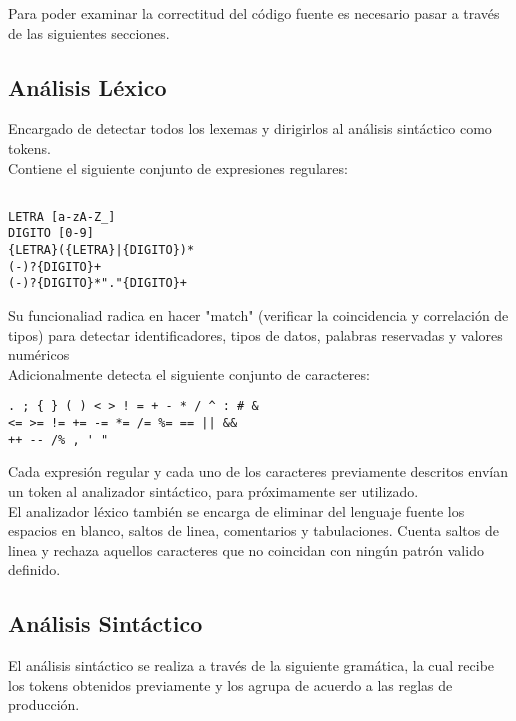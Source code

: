 \documentclass[aspectratio=169]{article}
\begin{document}
	Para poder examinar la correctitud del c\'odigo fuente es necesario pasar a trav\'es de las siguientes secciones.

\subsection{An\'alisis L\'exico}

	Encargado de detectar todos los lexemas y dirigirlos al análisis sintáctico como tokens.\\

	Contiene el siguiente conjunto de expresiones regulares:\\

\begin{lstlisting}

LETRA [a-zA-Z_]
DIGITO [0-9]
{LETRA}({LETRA}|{DIGITO})*
(-)?{DIGITO}+
(-)?{DIGITO}*"."{DIGITO}+

\end{lstlisting}

	Su funcionaliad radica en hacer "match" (verificar la coincidencia y correlaci\'on de tipos) para detectar identificadores, tipos de datos, palabras reservadas y valores numéricos\\

	Adicionalmente detecta el siguiente conjunto de caracteres: \\

\begin{lstlisting}
. ; { } ( ) < > ! = + - * / ^ : # &
<= >= != += -= *= /= %= == || &&
++ -- /% , ' "
\end{lstlisting}

	Cada expresión regular y cada uno de los caracteres previamente descritos envían un token al analizador sintáctico, para pr\'oximamente ser utilizado.\\

	El analizador léxico también se encarga de eliminar del lenguaje fuente los espacios en blanco, saltos de linea, comentarios y tabulaciones. Cuenta saltos de linea y rechaza aquellos caracteres que no coincidan con ningún patrón valido definido.


\subsection{An\'alisis Sint\'actico}

	El análisis sintáctico se realiza a través de la siguiente gramática, la cual recibe los tokens obtenidos previamente y los agrupa de acuerdo a las reglas de producción.
\end{document}
